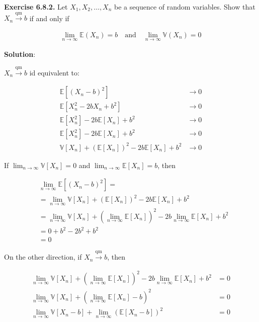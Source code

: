 \textbf{Exercise 6.8.2.} Let \(X_{1}, X_{2}, \dots, X_{n}\) be a sequence of
random variables. Show that \(X_{n} \xrightarrow{\text{qm}} b\) if and
only if

\begin{align*}\lim_{n \rightarrow \infty} \mathbb{E}(X_{n}) = b
\quad\mathrm{and}\quad 
\lim_{n \rightarrow \infty} \mathbb{V}(X_{n}) = 0
\end{align*}

\textbf{Solution}:

\(X_{n} \xrightarrow{\text{qm}} b\) id equivalent to:

\begin{align*}
\mathbb{E}[(X_{n} - b)^{2}]           & \rightarrow 0 \\
\mathbb{E}[X_{n}^{2} - 2b X_{n} + b^{2}]  & \rightarrow 0 \\
\mathbb{E}[X_{n}^{2}] - 2b \mathbb{E}[X_{n}] + b^{2} & \rightarrow 0 \\
\mathbb{E}[X_{n}^{2}] - 2b \mathbb{E}[X_{n}] + b^{2} & \rightarrow 0 \\
\mathbb{V}[X_{n}] + (\mathbb{E}[X_{n}])^{2} - 2b \mathbb{E}[X_{n}] + b^{2}  & \rightarrow 0
\end{align*}

If \(\lim_{n \rightarrow \infty} \mathbb{V}[X_{n}] = 0\) and
\(\lim_{n \rightarrow \infty} \mathbb{E}[X_{n}] = b\), then

\begin{align*}
& \lim_{n \rightarrow \infty} \mathbb{E}[(X_{n} - b)^{2}] = \\
& = \lim_{n \rightarrow \infty} \mathbb{V}[X_{n}] + (\mathbb{E}[X_{n}])^{2} - 2b \mathbb{E}[X_{n}] + b^{2} \\
& = \lim_{n \rightarrow \infty} \mathbb{V}[X_{n}] + (\lim_{n \rightarrow \infty} \mathbb{E}[X_{n}])^{2} - 2b \lim_{n \rightarrow \infty} \mathbb{E}[X_{n}] + b^{2} \\
&= 0 + b^{2} - 2b^{2} + b^{2} \\
&= 0
\end{align*}

On the other direction, if \(X_{n} \xrightarrow{\text{qm}} b\), then

\begin{align*}
\lim_{n \rightarrow \infty} \mathbb{V}[X_{n}] + (\lim_{n \rightarrow \infty} \mathbb{E}[X_{n}])^{2} - 2b \lim_{n \rightarrow \infty} \mathbb{E}[X_{n}] + b^{2} &= 0 \\
\lim_{n \rightarrow \infty} \mathbb{V}[X_{n}] + (\lim_{n \rightarrow \infty} \mathbb{E}[X_{n}] - b)^{2} &= 0 \\
\lim_{n \rightarrow \infty} \mathbb{V}[X_{n} - b] + \lim_{n \rightarrow \infty}  (\mathbb{E}[X_{n} - b])^{2} &= 0
\end{align*}

